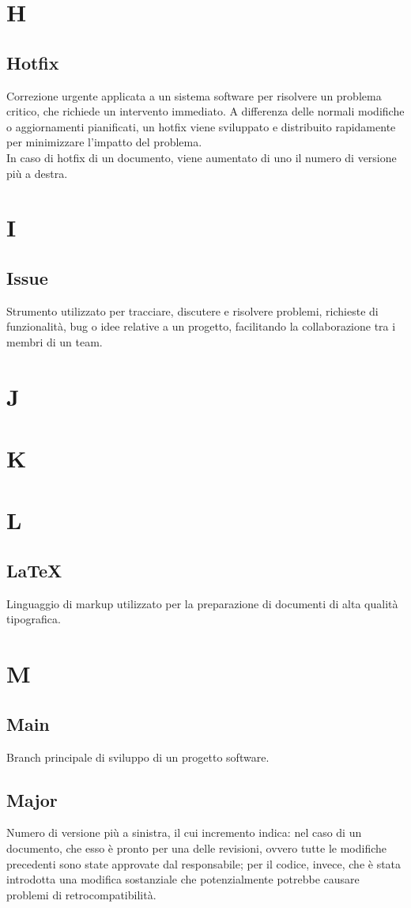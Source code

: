 \section{H}
    \subsection{Hotfix}
    Correzione urgente applicata a un sistema software per risolvere un problema critico, 
    che richiede un intervento immediato. A differenza delle normali modifiche o aggiornamenti pianificati, 
    un hotfix viene sviluppato e distribuito rapidamente per minimizzare l'impatto del problema.\\
    In caso di hotfix di un documento, viene aumentato di uno il numero di versione più a destra.

\section{I}
    \subsection{Issue}
    Strumento utilizzato per tracciare, discutere e risolvere problemi, richieste di funzionalità, 
    bug o idee relative a un progetto, facilitando la collaborazione tra i membri di un team.
\section{J}
\section{K}
\section{L}
    \subsection{LaTeX}
    Linguaggio di markup utilizzato per la preparazione di documenti di alta qualità tipografica.
\section{M}
    \subsection{Main}
    Branch principale di sviluppo di un progetto software.
    \subsection{Major}
    Numero di versione più a sinistra, il cui incremento indica: nel caso di un documento, che esso è pronto per una delle revisioni, ovvero tutte le modifiche precedenti sono state 
    approvate dal responsabile; per il codice, invece, che è stata introdotta una modifica sostanziale che potenzialmente potrebbe causare problemi di retrocompatibilità.

